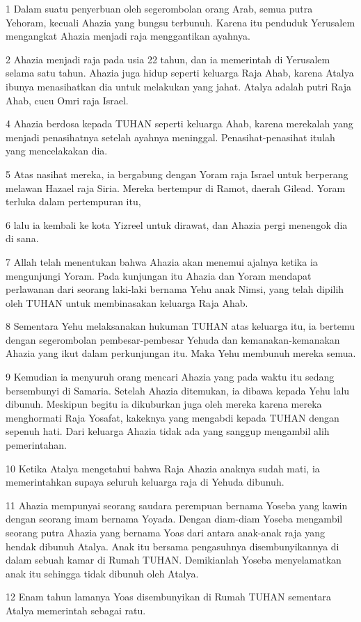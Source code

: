 \par 1 Dalam suatu penyerbuan oleh segerombolan orang Arab, semua putra Yehoram, kecuali Ahazia yang bungsu terbunuh. Karena itu penduduk Yerusalem mengangkat Ahazia menjadi raja menggantikan ayahnya.
\par 2 Ahazia menjadi raja pada usia 22 tahun, dan ia memerintah di Yerusalem selama satu tahun. Ahazia juga hidup seperti keluarga Raja Ahab, karena Atalya ibunya menasihatkan dia untuk melakukan yang jahat. Atalya adalah putri Raja Ahab, cucu Omri raja Israel.
\par 4 Ahazia berdosa kepada TUHAN seperti keluarga Ahab, karena merekalah yang menjadi penasihatnya setelah ayahnya meninggal. Penasihat-penasihat itulah yang mencelakakan dia.
\par 5 Atas nasihat mereka, ia bergabung dengan Yoram raja Israel untuk berperang melawan Hazael raja Siria. Mereka bertempur di Ramot, daerah Gilead. Yoram terluka dalam pertempuran itu,
\par 6 lalu ia kembali ke kota Yizreel untuk dirawat, dan Ahazia pergi menengok dia di sana.
\par 7 Allah telah menentukan bahwa Ahazia akan menemui ajalnya ketika ia mengunjungi Yoram. Pada kunjungan itu Ahazia dan Yoram mendapat perlawanan dari seorang laki-laki bernama Yehu anak Nimsi, yang telah dipilih oleh TUHAN untuk membinasakan keluarga Raja Ahab.
\par 8 Sementara Yehu melaksanakan hukuman TUHAN atas keluarga itu, ia bertemu dengan segerombolan pembesar-pembesar Yehuda dan kemanakan-kemanakan Ahazia yang ikut dalam perkunjungan itu. Maka Yehu membunuh mereka semua.
\par 9 Kemudian ia menyuruh orang mencari Ahazia yang pada waktu itu sedang bersembunyi di Samaria. Setelah Ahazia ditemukan, ia dibawa kepada Yehu lalu dibunuh. Meskipun begitu ia dikuburkan juga oleh mereka karena mereka menghormati Raja Yosafat, kakeknya yang mengabdi kepada TUHAN dengan sepenuh hati. Dari keluarga Ahazia tidak ada yang sanggup mengambil alih pemerintahan.
\par 10 Ketika Atalya mengetahui bahwa Raja Ahazia anaknya sudah mati, ia memerintahkan supaya seluruh keluarga raja di Yehuda dibunuh.
\par 11 Ahazia mempunyai seorang saudara perempuan bernama Yoseba yang kawin dengan seorang imam bernama Yoyada. Dengan diam-diam Yoseba mengambil seorang putra Ahazia yang bernama Yoas dari antara anak-anak raja yang hendak dibunuh Atalya. Anak itu bersama pengasuhnya disembunyikannya di dalam sebuah kamar di Rumah TUHAN. Demikianlah Yoseba menyelamatkan anak itu sehingga tidak dibunuh oleh Atalya.
\par 12 Enam tahun lamanya Yoas disembunyikan di Rumah TUHAN sementara Atalya memerintah sebagai ratu.

